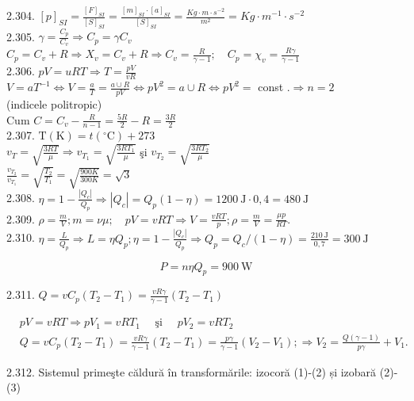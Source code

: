\documentclass[10pt]{article}
\begin{document}
2.304. $[p]_{S I}=\frac{[F]_{S I}}{[S]_{S I}}=\frac{[m]_{S I} \cdot[a]_{S I}}{[S]_{S I}}=\frac{K g \cdot m \cdot s^{-2}}{m^{2}}=K g \cdot m^{-1} \cdot s^{-2}$\\
2.305. $\gamma=\frac{C_{p}}{C_{v}} \Rightarrow C_{p}=\gamma C_{v}$\\
$C_{p}=C_{v}+R \Rightarrow X_{v}=C_{v}+R \Rightarrow C_{v}=\frac{R}{\gamma-1} ; \quad C_{p}=\chi_{v}=\frac{R \gamma}{\gamma-1}$\\
2.306. $p V=u R T \Rightarrow T=\frac{p V}{v R}$\\
$V=a T^{-1} \Leftrightarrow V=\frac{a}{T}=\frac{a \cup R}{p V} \Leftrightarrow p V^{2}=a \cup R \Leftrightarrow p V^{2}=$ const $. \Rightarrow n=2$\\
(indicele politropic)\\
Cum $C=C_{v}-\frac{R}{n-1}=\frac{5 R}{2}-R=\frac{3 R}{2}$\\
2.307. $\mathrm{T}(\mathrm{K})=t\left({ }^{\circ} \mathrm{C}\right)+273$\\
$v_{T}=\sqrt{\frac{3 R T}{\mu}} \Rightarrow v_{T_{1}}=\sqrt{\frac{3 R T_{1}}{\mu}}$ şi $v_{T_{2}}=\sqrt{\frac{3 R T_{2}}{\mu}}$\\
$\frac{v_{T_{2}}}{v_{T_{1}}}=\sqrt{\frac{T_{2}}{T_{1}}}=\sqrt{\frac{900 K}{300 K}}=\sqrt{3}$\\
2.308. $\eta=1-\frac{\left|Q_{c}\right|}{Q_{p}} \Rightarrow\left|Q_{c}\right|=Q_{p}(1-\eta)=1200 \mathrm{~J} \cdot 0,4=480 \mathrm{~J}$\\
2.309. $\rho=\frac{m}{V} ; m=\nu \mu ; \quad p V=v R T \Rightarrow V=\frac{v R T}{p} ; \rho=\frac{m}{V}=\frac{\mu p}{R T}$.\\
2.310. $\eta=\frac{L}{Q_{p}} \Rightarrow L=\eta Q_{p} ; \eta=1-\frac{\left|Q_{c}\right|}{Q_{p}} \Rightarrow Q_{p}=Q_{c} /(1-\eta)=\frac{210 \mathrm{~J}}{0,7}=300 \mathrm{~J}$

$$
P=n \eta Q_{p}=900 \mathrm{~W}
$$

2.311. $Q=v C_{p}\left(T_{2}-T_{1}\right)=\frac{v R \gamma}{\gamma-1}\left(T_{2}-T_{1}\right)$

$$
\begin{aligned}
& p V=v R T \Rightarrow p V_{1}=v R T_{1} \quad \text { şi } \quad p V_{2}=v R T_{2} \\
& Q=v C_{p}\left(T_{2}-T_{1}\right)=\frac{v R \gamma}{\gamma-1}\left(T_{2}-T_{1}\right)=\frac{p \gamma}{\gamma-1}\left(V_{2}-V_{1}\right) ; \Rightarrow V_{2}=\frac{Q(\gamma-1)}{p \gamma}+V_{1} .
\end{aligned}
$$

2.312. Sistemul primeşte căldură în transformările: izocoră (1)-(2) și izobară (2)-(3)
\end{document}
